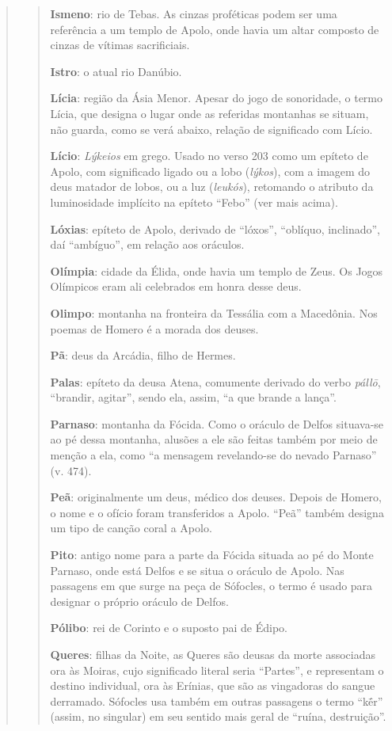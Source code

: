 \begin{verse}
\begin{verse}
\textbf{Ismeno}: rio de Tebas. As cinzas proféticas podem ser uma
referência a um templo de Apolo, onde havia um altar composto de cinzas
de vítimas sacrificiais.

\textbf{Istro}: o atual rio Danúbio.

\textbf{Lícia}: região da Ásia Menor. Apesar do jogo de sonoridade,
o termo Lícia, que designa o lugar onde as referidas montanhas se
situam, não guarda, como se verá abaixo, relação de significado com
Lício.

\textbf{Lício}: \emph{Lýkeios} em grego. Usado no verso 203 como um
epíteto de Apolo, com significado ligado ou a lobo (\emph{lýkos}), com a
imagem do deus matador de lobos, ou a luz (\emph{leukós}), retomando o
atributo da luminosidade implícito na epíteto ``Febo'' (ver mais acima).

\textbf{Lóxias}: epíteto de Apolo, derivado de ``lóxos'', ``oblíquo,
inclinado'', daí ``ambíguo'', em relação aos oráculos.

\textbf{Olímpia}: cidade da Élida, onde havia um templo de Zeus. Os
Jogos Olímpicos eram ali celebrados em honra desse deus.

\textbf{Olimpo}: montanha na fronteira da Tessália com a Macedônia.
Nos poemas de Homero é a morada dos deuses.

\textbf{Pã}: deus da Arcádia, filho de Hermes.

\textbf{Palas}: epíteto da deusa Atena, comumente derivado do verbo
\emph{pállō}, ``brandir, agitar'', sendo ela, assim, ``a que brande a
lança''.

\textbf{Parnaso}: montanha da Fócida. Como o oráculo de Delfos
situava-se ao pé dessa montanha, alusões a ele são feitas também por
meio de menção a ela, como ``a mensagem revelando-se do nevado Parnaso''
(v. 474).

\textbf{Peã}: originalmente um deus, médico dos deuses. Depois de
Homero, o nome e o ofício foram transferidos a Apolo. ``Peã'' também
designa um tipo de canção coral a Apolo.

\textbf{Pito}: antigo nome para a parte da Fócida situada ao pé do
Monte Parnaso, onde está Delfos e se situa o oráculo de Apolo. Nas
passagens em que surge na peça de Sófocles, o termo é usado para
designar o próprio oráculo de Delfos.

\textbf{Pólibo}: rei de Corinto e o suposto pai de Édipo.

\textbf{Queres}: filhas da Noite, as Queres são deusas da morte
associadas ora às Moiras, cujo significado literal seria ``Partes'', e
representam o destino individual, ora às Erínias, que são as vingadoras
do sangue derramado. Sófocles usa também em outras passagens o termo
``kḗr'' (assim, no singular) em seu sentido mais geral de ``ruína,
destruição''.



\end{verse}
\end{verse}

